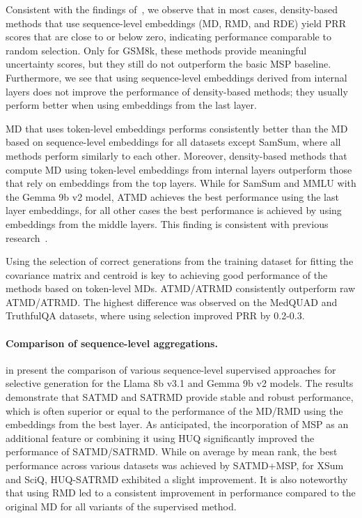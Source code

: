 \documentclass[11pt]{article}
\begin{document}
  Consistent with the findings of~\citet{vashurin2024benchmakring}, we observe that in most cases, density-based methods that use sequence-level embeddings (MD, RMD, and RDE) yield PRR scores that are close to or below zero, indicating performance comparable to random selection. Only for GSM8k, these methods provide meaningful uncertainty scores, but they still do not outperform the basic MSP baseline. Furthermore, we see that using sequence-level embeddings derived from internal layers does not improve the performance of density-based methods; they usually perform better when using embeddings from the last layer. 
  
  
  MD that uses token-level embeddings performs consistently better than the MD based on sequence-level embeddings for all datasets except SamSum, where all methods perform similarly to each other.
  Moreover, density-based methods that compute MD using token-level embeddings from internal layers outperform those that rely on embeddings from the top layers. While for SamSum and MMLU with the Gemma 9b v2 model, ATMD achieves the best performance using the last layer embeddings, for all other cases the best performance is achieved by using embeddings from the middle layers. This finding is consistent with previous research~\cite{azaria-mitchell-2023-internal,chen2024eigenscore}. 
  
  Using the selection of correct generations from the training dataset for fitting the covariance matrix and centroid is key to achieving good performance of the methods based on token-level MDs. ATMD/ATRMD consistently outperform raw ATMD/ATRMD. The highest difference was observed on the MedQUAD and TruthfulQA datasets, where using selection improved PRR by 0.2-0.3. 
  
\paragraph{Comparison of sequence-level aggregations.}
   in  present the comparison of various sequence-level supervised approaches for selective generation for the Llama 8b v3.1 and Gemma 9b v2 models. The results demonstrate that SATMD and SATRMD provide stable and robust performance, which is often superior or equal to the performance of the MD/RMD using the embeddings from the best layer. As anticipated, the incorporation of MSP as an additional feature or combining it using HUQ significantly improved the performance of SATMD/SATRMD. While on average by mean rank, the best performance across various datasets was achieved by SATMD+MSP, for XSum and SciQ, HUQ-SATRMD exhibited a slight improvement. It is also noteworthy that using RMD led to a consistent improvement in performance compared to the original MD for all variants of the supervised method. 
\end{document}
